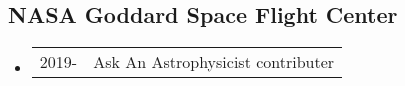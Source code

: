 \subsection*{NASA Goddard Space Flight Center}
\begin{itemize}
\item \begin{tabular}{ll}
2019- & Ask An Astrophysicist contributer
\end{tabular}
\end{itemize}





\bigskip



